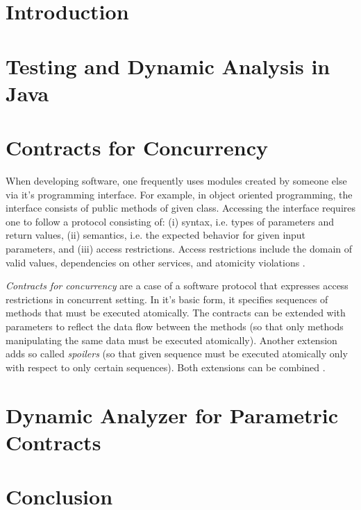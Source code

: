 \chapter{Introduction}

\todo{}

\chapter{Testing and Dynamic Analysis in Java}

\todo{}

\chapter{Contracts for Concurrency}


When developing software, one frequently uses modules created by someone else
via it's programming interface. For example, in object oriented programming, the
interface consists of public methods of given class. Accessing the interface
requires one to follow a protocol consisting of: (i) syntax, i.e. types of
parameters and return values, (ii) semantics, i.e. the expected behavior for
given input parameters, and (iii) access restrictions. Access restrictions
include the domain of valid values, dependencies on other services, and
atomicity violations \cite{FITPUB11510}.

\emph{Contracts for concurrency} \cite{FITPUB10817}
\cite{DBLP:journals/corr/SousaDFL15} are a case of a software protocol that
expresses access restrictions in concurrent setting. In it's basic form, it
specifies sequences of methods that must be executed atomically. The contracts
can be extended with parameters to reflect the data flow between the methods (so
that only methods manipulating the same data must be executed atomically).
Another extension adds so called \emph{spoilers} (so that given sequence must be
executed atomically only with respect to only certain sequences). Both
extensions can be combined \cite{FITPUB11510}.


\chapter{Dynamic Analyzer for Parametric Contracts}

\todo{}

\chapter{Conclusion}

\todo{}
